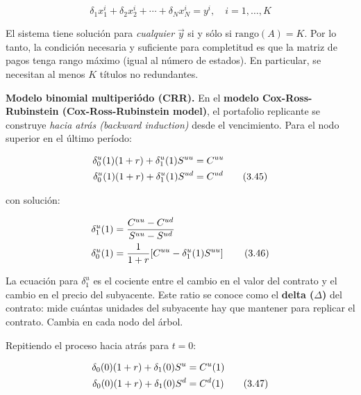 \documentclass[12pt]{article}
\begin{document}
\begin{equation}
  \delta_1 x_1^i + \delta_2 x_2^i + \cdots + \delta_N x_N^i = y^i, \quad i = 1,\ldots,K
\end{equation}

\begin{intuicionmat}
El sistema tiene soluci\'on para \textit{cualquier} $\vec{y}$ si y s\'olo si $\text{rango}(A) = K$. Por lo tanto, la condici\'on necesaria y suficiente para completitud es que la matriz de pagos tenga rango m\'aximo (igual al n\'umero de estados). En particular, se necesitan al menos $K$ t\'itulos no redundantes.
\end{intuicionmat}

\textbf{Modelo binomial multiperi\'odo (CRR).} En el \textbf{modelo Cox-Ross-Rubinstein (Cox-Ross-Rubinstein model)}, el portafolio replicante se construye \textit{hacia atr\'as (backward induction)} desde el vencimiento. Para el nodo superior en el \'ultimo per\'iodo:

\begin{align}
  \delta_0^u(1)(1+r) + \delta_1^u(1)S^{uu} &= C^{uu} \notag \\
  \delta_0^u(1)(1+r) + \delta_1^u(1)S^{ud} &= C^{ud}
  \tag{3.45}
\end{align}

con soluci\'on:

\begin{align}
  \delta_1^u(1) &= \frac{C^{uu} - C^{ud}}{S^{uu} - S^{ud}} \notag \\
  \delta_0^u(1) &= \frac{1}{1+r}\!\left[C^{uu} - \delta_1^u(1)S^{uu}\right]
  \tag{3.46}
\end{align}

\begin{intuicionmat}
La ecuaci\'on para $\delta_1^u$ es el cociente entre el cambio en el valor del contrato y el cambio en el precio del subyacente. Este ratio se conoce como el \textbf{delta ($\Delta$)} del contrato: mide cu\'antas unidades del subyacente hay que mantener para replicar el contrato. Cambia en cada nodo del \'arbol.
\end{intuicionmat}

Repitiendo el proceso hacia atr\'as para $t=0$:

\begin{align}
  \delta_0(0)(1+r) + \delta_1(0)S^u &= C^u(1) \notag \\
  \delta_0(0)(1+r) + \delta_1(0)S^d &= C^d(1)
  \tag{3.47}
\end{align}
\end{document}
